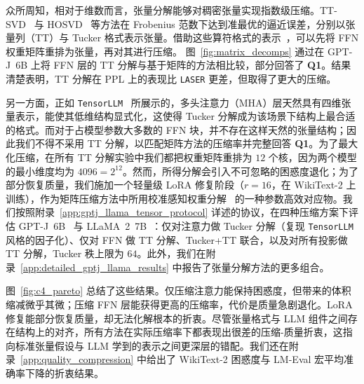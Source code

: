 \documentclass[11pt]{article}
\begin{document}
\begin{mainpart}
众所周知，相对于维数而言，张量分解能够对稠密张量实现指数级压缩。TT-SVD~\citep{oseledets2011tensor} 与 HOSVD~\citep{hosvdopt} 等方法在 Frobenius 范数下达到准最优的逼近误差，分别以张量列（TT）与 Tucker 格式表示张量。借助这些算符格式的表示~\citep{tyrtyshnikov2003tensor, hackbusch2006low, oseledets2011tensor}，可以先将 FFN 权重矩阵重排为张量，再对其进行压缩。
图~\ref{fig:matrix_decomps} 通过在 GPT-J~6B 上将 FFN 层的 TT 分解与基于矩阵的方法相比较，部分回答了 \textbf{Q1}。结果清楚表明，TT 分解在 PPL 上的表现比 \texttt{LASER} 更差，但取得了更大的压缩。

另一方面，正如 \texttt{TensorLLM}~\citep{tensorllm2025} 所展示的，多头注意力（MHA）层天然具有四维张量表示，能使其低维结构显式化，这使得 Tucker 分解成为该场景下结构上最合适的格式。而对于占模型参数大多数的 FFN 块，并不存在这样天然的张量结构；因此我们不得不采用 TT 分解，以匹配矩阵方法的压缩率并完整回答 \textbf{Q1}。为了最大化压缩，在所有 TT 分解实验中我们都把权重矩阵重排为 $12$ 个核，因为两个模型的最小维度均为 $4096 = 2^{12}$。然而，所得分解会引入不可忽略的困惑度退化；为了部分恢复质量，我们施加一个轻量级 LoRA 修复阶段（$r=16$，在 WikiText-2 上训练），作为矩阵压缩方法中所用校准感知权重分解~\citep{wang2025dobisvd,svdllm2025} 的一种参数高效对应物。我们按照附录~\ref{app:gptj_llama_tensor_protocol} 详述的协议，在四种压缩方案下评估 GPT-J~6B~\citep{gpt-j} 与 LLaMA~2~7B~\citep{touvron2023llama}：仅对注意力做 Tucker 分解（复现 \texttt{TensorLLM} 风格的因子化）、仅对 FFN 做 TT 分解、Tucker+TT 联合，以及对所有投影做 TT 分解，Tucker 秩上限为 $64$。此外，我们在附录~\ref{app:detailed_gptj_llama_results} 中报告了张量分解方法的更多组合。





图~\ref{fig:c4_pareto} 总结了这些结果。仅压缩注意力能保持困惑度，但带来的体积缩减微乎其微；压缩 FFN 层能获得更高的压缩率，代价是质量急剧退化。LoRA 修复能部分恢复质量，却无法化解根本的折衷。尽管张量格式与 LLM 组件之间存在结构上的对齐，所有方法在实际压缩率下都表现出很差的压缩-质量折衷，这指向标准张量假设与 LLM 学到的表示之间更深层的错配。我们还在附录~\ref{app:quality_compression} 中给出了 WikiText-2 困惑度与 LM-Eval 宏平均准确率下降的折衷结果。


\end{mainpart}
\end{document}
